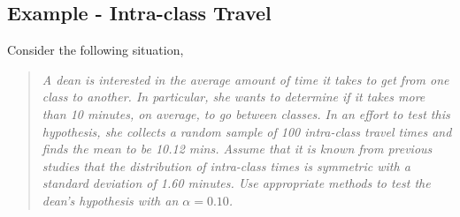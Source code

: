 \documentclass[10pt,openany]{book}\usepackage[]{graphicx}\usepackage[]{color}
\begin{document}
\subsection{Example - Intra-class Travel}
Consider the following situation,
\begin{quote}
\textsl{A dean is interested in the average amount of time it takes to get from one class to another.  In particular, she wants to determine if it takes more than 10 minutes, on average, to go between classes.  In an effort to test this hypothesis, she collects a random sample of 100 intra-class travel times and finds the mean to be 10.12 mins.  Assume that it is known from previous studies that the distribution of intra-class times is symmetric with a standard deviation of 1.60 minutes.  Use appropriate methods to test the dean's hypothesis with an $\alpha=0.10$.}
\end{quote}
\end{document}
